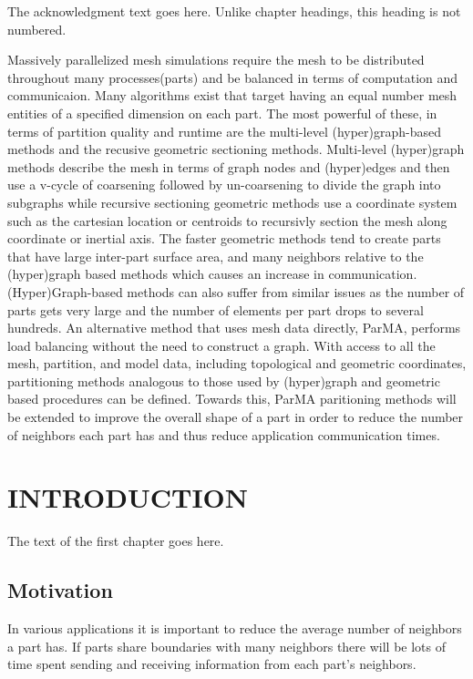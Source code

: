 \documentclass{thesis}
\author{Gerrett Diamond, Cameron Smith}
\begin{document}
 
\titlepage             %
\tableofcontents       %
\listoftables          %
\listoffigures         %

The acknowledgment text goes here. Unlike chapter headings, 
this heading is not numbered.

Massively parallelized mesh simulations require the mesh to be distributed
throughout many processes(parts) and be balanced in terms of computation and
communicaion. 
Many algorithms exist that target having an equal number mesh entities of a
specified dimension on each part. 
The most powerful of these, in terms of partition quality and runtime are the
multi-level (hyper)graph-based methods and the recusive geometric sectioning
methods. 
Multi-level (hyper)graph methods describe the mesh in terms of graph nodes and
(hyper)edges and then use a v-cycle of coarsening followed by un-coarsening to
divide the graph into subgraphs while recursive sectioning geometric methods use
a coordinate system such as the cartesian location or centroids to recursivly
section the mesh along coordinate or inertial axis. 
The faster geometric methods tend to create parts that have large inter-part
surface area, and many neighbors relative to the (hyper)graph based methods
which causes an increase in communication.
(Hyper)Graph-based methods can also suffer from similar issues as the number of
parts gets very large and the number of elements per part drops to several
hundreds. 
An alternative method that uses mesh data directly, ParMA, performs load 
balancing without the need to construct a graph. 
With access to all the mesh, partition, and model data, including topological 
and geometric coordinates, partitioning methods analogous to those used by 
(hyper)graph and geometric based procedures can be defined.
Towards this, ParMA paritioning methods will be extended to improve the overall 
shape of a part in order to reduce the number of neighbors each part has and 
thus reduce application communication times.

\chapter{INTRODUCTION}
The text of the first chapter goes here. 

\section{Motivation}
In various applications it is important to reduce the average number of neighbors
a part has. If parts share boundaries with many neighbors there will be lots of 
time spent sending and receiving information from each part's neighbors.
\end{document}
